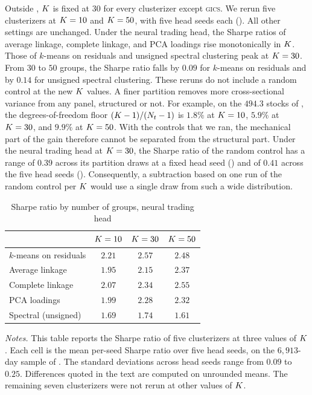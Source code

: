 Outside , $K$ is fixed at $30$ for every clusterizer except \textsc{gics}. We rerun five clusterizers at
$K = 10$ and $K = 50$, with five head seeds each
(). All other settings are unchanged. Under the neural trading head, the Sharpe ratios of average linkage, complete linkage, and PCA loadings rise monotonically in $K$. Those of $k$-means on residuals and unsigned spectral clustering peak at $K=30$. From $30$ to $50$ groups, the Sharpe ratio falls by $0.09$ for $k$-means on residuals and by $0.14$ for unsigned spectral clustering. These reruns do not include a random control at the new $K$ values.
A finer partition removes more cross-sectional variance from any panel, structured or not. For example, on the $494.3$ stocks of , the degrees-of-freedom floor $(K-1)/(N_t-1)$ is $1.8\%$ at $K = 10$, $5.9\%$ at $K = 30$, and $9.9\%$ at $K = 50$. With
the controls that we ran, the mechanical part of the gain therefore cannot be separated from the structural part. Under the neural trading head at $K=30$, the Sharpe ratio of the random control has a range of $0.39$ across its partition draws at a fixed head seed () and of $0.41$ across the five head seeds (). Consequently, a subtraction based on one run of the random control per $K$ would use a single draw from such a wide distribution.

\begin{table}[htbp]
\centering
\caption{Sharpe ratio by number of groups, neural trading head}
\label{tab:ksweep}
\begin{threeparttable}
\small
\begin{tabular}{@{}lccc@{}}
\toprule
& $K=10$ & $K=30$ & $K=50$ \\
\midrule
$k$-means on residuals & $2.21$ & $2.57$ & $2.48$ \\
Average linkage & $1.95$ & $2.15$ & $2.37$ \\
Complete linkage & $2.07$ & $2.34$ & $2.55$ \\
PCA loadings & $1.99$ & $2.28$ & $2.32$ \\
Spectral (unsigned) & $1.69$ & $1.74$ & $1.61$ \\
\bottomrule
\end{tabular}
\begin{tablenotes}[flushleft]\small
\item \emph{Notes.} This table reports the Sharpe ratio of five clusterizers at three values of $K$. Each cell is the mean per-seed Sharpe ratio over five head seeds, on the $6{,}913$-day sample of . The standard deviations across head seeds range from $0.09$ to $0.25$. Differences quoted in the text are computed on unrounded means. The remaining
seven clusterizers were not rerun at other values of $K$.
\end{tablenotes}
\end{threeparttable}
\end{table}

